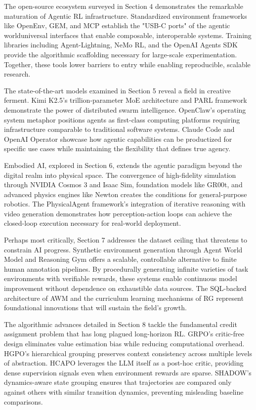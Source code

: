 The open-source ecosystem surveyed in Section 4 demonstrates the remarkable maturation of Agentic RL infrastructure. Standardized environment frameworks like OpenEnv, GEM, and MCP establish the "USB-C ports" of the agentic worlduniversal interfaces that enable composable, interoperable systems. Training libraries including Agent-Lightning, NeMo RL, and the OpenAI Agents SDK provide the algorithmic scaffolding necessary for large-scale experimentation. Together, these tools lower barriers to entry while enabling reproducible, scalable research.

The state-of-the-art models examined in Section 5 reveal a field in creative ferment. Kimi K2.5's trillion-parameter MoE architecture and PARL framework demonstrate the power of distributed swarm intelligence. OpenClaw's operating system metaphor positions agents as first-class computing platforms requiring infrastructure comparable to traditional software systems. Claude Code and OpenAI Operator showcase how agentic capabilities can be productized for specific use cases while maintaining the flexibility that defines true agency.

Embodied AI, explored in Section 6, extends the agentic paradigm beyond the digital realm into physical space. The convergence of high-fidelity simulation through NVIDIA Cosmos 3 and Isaac Sim, foundation models like GR00t, and advanced physics engines like Newton creates the conditions for general-purpose robotics. The PhysicalAgent framework's integration of iterative reasoning with video generation demonstrates how perception-action loops can achieve the closed-loop execution necessary for real-world deployment.

Perhaps most critically, Section 7 addresses the dataset ceiling that threatens to constrain AI progress. Synthetic environment generation through Agent World Model and Reasoning Gym offers a scalable, controllable alternative to finite human annotation pipelines. By procedurally generating infinite varieties of task environments with verifiable rewards, these systems enable continuous model improvement without dependence on exhaustible data sources. The SQL-backed architecture of AWM and the curriculum learning mechanisms of RG represent foundational innovations that will sustain the field's growth.

The algorithmic advances detailed in Section 8 tackle the fundamental credit assignment problem that has long plagued long-horizon RL. GRPO's critic-free design eliminates value estimation bias while reducing computational overhead. HGPO's hierarchical grouping preserves context consistency across multiple levels of abstraction. HCAPO leverages the LLM itself as a post-hoc critic, providing dense supervision signals even when environment rewards are sparse. SHADOW's dynamics-aware state grouping ensures that trajectories are compared only against others with similar transition dynamics, preventing misleading baseline comparisons.

